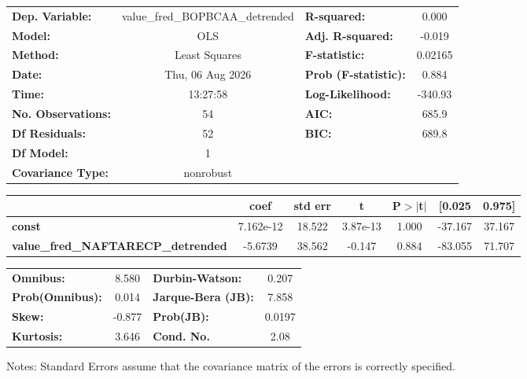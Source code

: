 \begin{center}
\begin{tabular}{lclc}
\toprule
\textbf{Dep. Variable:}                    & value\_fred\_BOPBCAA\_detrended & \textbf{  R-squared:         } &     0.000   \\
\textbf{Model:}                            &               OLS               & \textbf{  Adj. R-squared:    } &    -0.019   \\
\textbf{Method:}                           &          Least Squares          & \textbf{  F-statistic:       } &   0.02165   \\
\textbf{Date:}                             &         Thu, 06 Aug 2026        & \textbf{  Prob (F-statistic):} &    0.884    \\
\textbf{Time:}                             &             13:27:58            & \textbf{  Log-Likelihood:    } &   -340.93   \\
\textbf{No. Observations:}                 &                  54             & \textbf{  AIC:               } &     685.9   \\
\textbf{Df Residuals:}                     &                  52             & \textbf{  BIC:               } &     689.8   \\
\textbf{Df Model:}                         &                   1             & \textbf{                     } &             \\
\textbf{Covariance Type:}                  &            nonrobust            & \textbf{                     } &             \\
\bottomrule
\end{tabular}
\begin{tabular}{lcccccc}
                                           & \textbf{coef} & \textbf{std err} & \textbf{t} & \textbf{P$> |$t$|$} & \textbf{[0.025} & \textbf{0.975]}  \\
\midrule
\textbf{const}                             &    7.162e-12  &       18.522     &  3.87e-13  &         1.000        &      -37.167    &       37.167     \\
\textbf{value\_fred\_NAFTARECP\_detrended} &      -5.6739  &       38.562     &    -0.147  &         0.884        &      -83.055    &       71.707     \\
\bottomrule
\end{tabular}
\begin{tabular}{lclc}
\textbf{Omnibus:}       &  8.580 & \textbf{  Durbin-Watson:     } &    0.207  \\
\textbf{Prob(Omnibus):} &  0.014 & \textbf{  Jarque-Bera (JB):  } &    7.858  \\
\textbf{Skew:}          & -0.877 & \textbf{  Prob(JB):          } &   0.0197  \\
\textbf{Kurtosis:}      &  3.646 & \textbf{  Cond. No.          } &     2.08  \\
\bottomrule
\end{tabular}
\end{center}

Notes: \newline
 [1] Standard Errors assume that the covariance matrix of the errors is correctly specified.